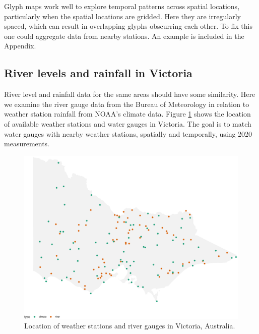\documentclass[
]{jss}
\begin{document}
Glyph maps work well to explore temporal patterns across spatial locations, particularly when the spatial locations are gridded. Here they are irregularly spaced, which can result in overlapping glyphs obscurring each other. To fix this one could aggregate data from nearby stations. An example is included in the Appendix.

\hypertarget{river-levels-and-rainfall-in-victoria}{%
\subsection{River levels and rainfall in Victoria}\label{river-levels-and-rainfall-in-victoria}}

River level and rainfall data for the same areas should have some similarity. Here we examine the river gauge data from the Bureau of Meteorology \citep{REF} in relation to weather station rainfall from NOAA's climate data. Figure \ref{fig:matching-map} shows the location of available weather stations and water gauges in Victoria. The goal is to match water gauges with nearby weather stations, spatially and temporally, using 2020 measurements.

\begin{CodeChunk}
\begin{figure}

{\centering \includegraphics{figures/matching-map-1} 

}

\caption[Location of weather stations and river gauges in Victoria, Australia]{Location of weather stations and river gauges in Victoria, Australia.}\label{fig:matching-map}
\end{figure}
\end{CodeChunk}
\end{document}
